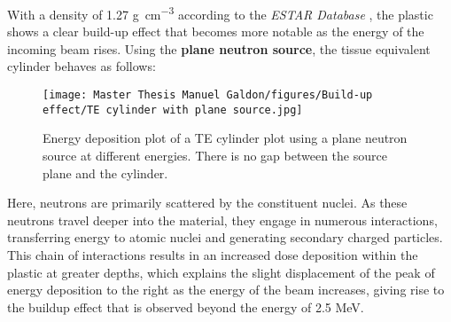 With a density of 1.27 \unit{\gram\per\cubic\centi\meter} according to the \textit{ESTAR Database} \cite{ESTAR}, the plastic shows a clear build-up effect that becomes more notable as the energy of the incoming beam rises. Using the \textbf{plane neutron source}, the tissue equivalent cylinder behaves as follows:

\begin{figure}[!h]
\centering
\begin{minipage}[t]{0.8\textwidth}
    \centering
    \texttt{[image: Master Thesis Manuel Galdon/figures/Build-up effect/TE cylinder with plane source.jpg]} 
    \caption{Energy deposition plot of a TE cylinder plot using a plane neutron source at different energies. There is no gap between the source plane and the cylinder.}
    \label{fig:A150 cylinder with plane neutron source}
\end{minipage}
\end{figure}

Here, neutrons are primarily scattered by the constituent nuclei. As these neutrons travel deeper into the material, they engage in numerous interactions, transferring energy to atomic nuclei and generating secondary charged particles. This chain of interactions results in an increased dose deposition within the plastic at greater depths, which explains the slight displacement of the peak of energy deposition to the right as the energy of the beam increases, giving rise to the buildup effect that is observed beyond the energy of 2.5 \unit{\mega\electronvolt}.
